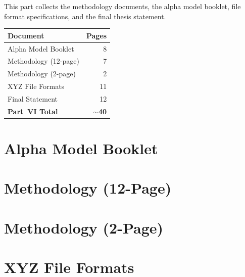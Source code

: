 \documentclass[11pt, letterpaper, oneside]{report}
\begin{document}
This part collects the methodology documents, the alpha model booklet,
file format specifications, and the final thesis statement.

\begin{center}
\renewcommand{\arraystretch}{1.3}
\begin{tabular}{lr}
\toprule
\textbf{Document} & \textbf{Pages} \\
\midrule
Alpha Model Booklet            &  8 \\
Methodology (12-page)          &  7 \\
Methodology (2-page)           &  2 \\
XYZ File Formats               & 11 \\
Final Statement                & 12 \\
\midrule
\textbf{Part~VI Total}         & \textbf{$\sim$40} \\
\bottomrule
\end{tabular}
\end{center}

\chapter{Alpha Model Booklet}
\label{ch:alpha}


\chapter{Methodology (12-Page)}
\label{ch:method12}


\chapter{Methodology (2-Page)}
\label{ch:method2}


\chapter{XYZ File Formats}
\label{ch:xyz}

\end{document}
